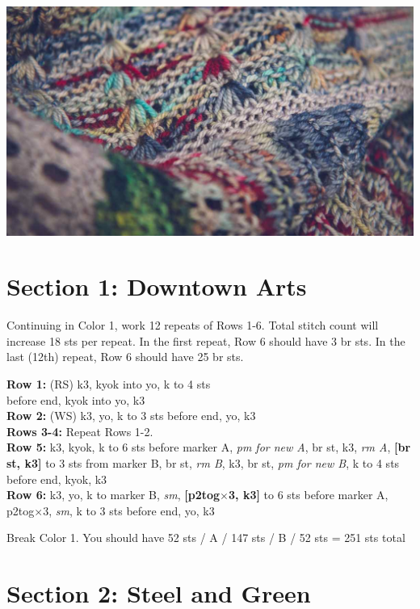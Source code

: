 \documentclass[12pt]{article}
\newcommand{\rowDir}[1]{\textbf{#1:}} %
\renewcommand{\repeat}[1]{\textbf{[#1]}} %
\newcommand{\x}{$\times$}			%
\renewcommand{\pm}[1]{\emph{pm #1}} %
\newcommand{\sm}{\emph{sm}} %
\renewcommand{\rm}[1]{\emph{rm #1}} %
\newenvironment{unframed}
    {%
\begin{addmargin}[2em]{0pt}
	\setlength{\parindent}{-2em}}
    {\setlength{\parindent}{0em}
	\end{addmargin}}
\begin{document}
\begin{multicols}{2}
\includegraphics[width=\linewidth]{brushdetail}
\vfill

\columnbreak

\section*{Section 1: Downtown Arts}

Continuing in Color 1, work 12 repeats of Rows 1-6. Total stitch count will increase 18 sts per repeat. In the first repeat, Row 6 should have 3 br sts. In the last (12th) repeat, Row 6 should have 25 br sts. 

\begin{unframed}
\rowDir{Row 1} (RS) k3, kyok into yo, k to 4 sts \\ before end, kyok into yo, k3 \\
\rowDir{Row 2} (WS) k3, yo, k to 3 sts before end, yo, k3 \\
\rowDir{Rows 3-4} Repeat Rows 1-2. \\
\rowDir{Row 5} k3, kyok, k to 6 sts before marker A, \pm{for new A}, br st, k3, \rm{A}, \repeat{br st, k3} to 3 sts from marker B, br st, \rm{B}, k3, br st, \pm{for new B}, k to 4 sts before end, kyok, k3 \\
\rowDir{Row 6} k3, yo, k to marker B, \sm{}, \repeat{p2tog\x3, k3} to 6 sts before marker A, p2tog\x3, \sm{}, k to 3 sts before end, yo, k3
\end{unframed}


Break Color 1. You should have 52 sts / A / 147 sts / B / 52 sts = 251 sts total 

\section*{Section 2: Steel and Green}


\end{multicols}
\end{document}
